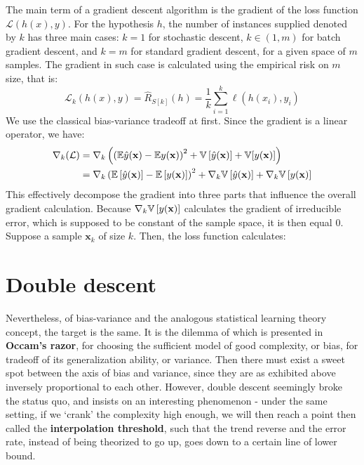 \documentclass[10pt,oneside,oldfontcommands,dvipsnames,article]{memoir}
\begin{document}
The main term of a gradient descent algorithm is the gradient of the loss function $\mathcal{L}(h(x),y)$. For the hypothesis $h$, the number of instances supplied denoted by $k$ has three main cases: $k=1$ for stochastic descent, $k\in (1,m)$ for batch gradient descent, and $k=m$ for standard gradient descent, for a given space of $m$ samples. The gradient in such case is calculated using the empirical risk on $m$ size, that is: 
\begin{equation}
    \mathcal{L}_{k}(h(x),y) = \hat{R}_{S[k]}(h) = \frac{1}{k} \sum^{k}_{i=1} \ell(h(x_{i}),y_{i})
\end{equation}
We use the classical bias-variance tradeoff at first. Since the gradient is a linear operator, we have: 
\begin{equation}
    \begin{split}
        \nabla_{k}(\mathcal{L}) &= \nabla_{k}\left(\left({\mathbb{E}\hat{y}(\mathbf{x}) - \mathbb{E} y(\mathbf{x})}\right)^2 + \mathbb{V}\left[{\hat{y}(\mathbf{x})}\right] + \mathbb{V}[{y(\mathbf{x})}]\right)\\
        & = \nabla_{k}\left( \mathbb{E}\left[\hat{y}(\mathbf{x})\right] - \mathbb{E}\left[y(\mathbf{x})\right] \right)^2 + \nabla_{k}\mathbb{V}\left[\hat{y}(\mathbf{x})\right] + \nabla_{k}\mathbb{V}\left[y(\mathbf{x})\right]
    \end{split}
\end{equation}
This effectively decompose the gradient into three parts that influence the overall gradient calculation. Because $\nabla_{k}\mathbb{V}\left[y(\mathbf{x})\right]$ calculates the gradient of irreducible error, which is supposed to be constant of the sample space, it is then equal $0$. Suppose a sample $\mathbf{x}_{k}$ of size $k$. Then, the loss function calculates: 

\clearpage
\section{Double descent}

Nevertheless, of bias-variance and the analogous statistical learning theory concept, the target is the same. It is the dilemma of which is presented in \textbf{Occam's razor}, for choosing the sufficient model of good complexity, or bias, for tradeoff of its generalization ability, or variance. Then there must exist a sweet spot between the axis of bias and variance, since they are as exhibited above inversely proportional to each other. However, double descent seemingly broke the status quo, and insists on an interesting phenomenon - under the same setting, if we `crank' the complexity high enough, we will then reach a point then called the \textbf{interpolation threshold}, such that the trend reverse and the error rate, instead of being theorized to go up, goes down to a certain line of lower bound. 
\end{document}
